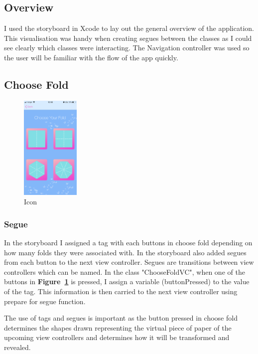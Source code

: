 \documentclass[11pt]{article}
\begin{document}
    
    \subsection{Overview}  
    I used the storyboard in Xcode to lay out the general overview of the application. This visualisation was handy when creating segues between the classes as I could see clearly which classes were interacting. The Navigation controller was used so the user will be familiar with the flow of the app quickly.
    
            \subsection{Choose Fold}
                \begin{figure}
                        \centering
                        \includegraphics[width=0.25\textwidth]{KiriZen/chooseFold.png}
                        \caption{Icon}
                        \label{fig:kiriZen-chooseFold}
                \end{figure}
                    
            \subsubsection{Segue}
            In the storyboard I assigned a tag with each buttons in choose fold depending on how many folds they were associated with. In the storyboard also added segues from each button to the next view controller. Segues are transitions between view controllers which can be named. In the class "ChooseFoldVC", when one of the buttons in \textbf{Figure~\ref{fig:kiriZen-chooseFold}} is pressed, I assign a variable (buttonPressed) to the value of the tag. This information is then carried to the next view controller using prepare for segue function.
            
            The use of tags and segues is important as the button pressed in choose fold determines the shapes drawn representing the virtual piece of paper of the upcoming view controllers and determines how it will be transformed and revealed.
                
\end{document}
